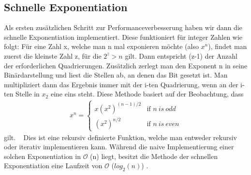 \documentclass[course=erap]{aspdoc}
\begin{document}
    \subsection{Schnelle Exponentiation}\label{Schnelle Exponentiation}
    Als ersten zusätzlichen Schritt zur Performanceverbesserung haben wir dann die schnelle Exponentiation implementiert. Diese funktioniert für integer Zahlen wie folgt: Für eine Zahl x, welche man n mal exponieren möchte (also \begin{math}
                                                                                                                                                                                                                                         x^n
    \end{math}), findet man zuerst die kleinste Zahl z, für die \begin{math}
                                                                    2^z > n
    \end{math} gilt. Dann entspricht (z-1) der Anzahl der erforderlichen Quadrierungen. Zusätzlich zerlegt man den Exponent n in seine Binärdarstellung und liest die Stellen ab, an denen das Bit gesetzt ist.
    Man multipliziert dann das Ergebnis immer mit der i-ten Quadrierung, wenn an der i-ten Stelle in \begin{math} x_2 \end{math} eine eins steht. Diese Methode basiert auf der Beobachtung, dass
    \begin{align}
        x^n = \begin{cases}
                  x(x^2)^{(n-1)/2} &\text{if } n\ is\ odd \\
                  (x^2)^{n/2} &\text{if } n\ is\ even
        \end{cases}
    \end{align}
    gilt. ~\cite{recursion} Dies ist eine rekursiv definierte Funktion, welche man entweder rekursiv oder iterativ implementieren kann. Während die naive Implementierung einer solchen Exponentiation in $\mathcal{O}$ (n) liegt, besitzt die Methode der schnellen Exponentiation eine Laufzeit von  $\mathcal{O}$ (\begin{math}
                                                                                                                                                                                                                                                                                                                          log_2(n)
    \end{math}) .
\end{document}
